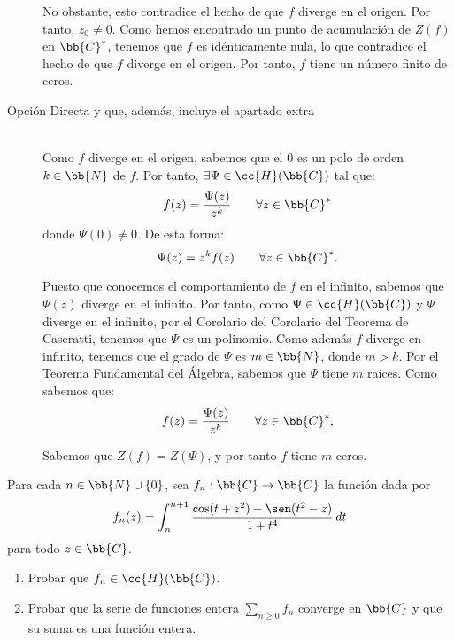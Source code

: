 \documentclass[12pt]{article}
\begin{document}
\begin{ejercicio}[2.5 + 1.5 puntos]
\begin{description}
                No obstante, esto contradice el hecho de que $f$ diverge en el origen. Por tanto, $z_0\neq 0$. Como hemos encontrado un punto de acumulación de $Z(f)$ en $\bb{C}^*$, tenemos que $f$ es idénticamente nula, lo que contradice el hecho de que $f$ diverge en el origen. Por tanto, $f$ tiene un número finito de ceros.\\
            \item[Opción Directa y que, además, incluye el apartado extra]~\\
            
            Como $f$ diverge en el origen, sabemos que el $0$ es un polo de orden $k\in \bb{N}$ de $f$. Por tanto, $\exists \Psi\in \cc{H}(\bb{C})$ tal que:
            \begin{equation*}
                f(z) = \dfrac{\Psi(z)}{z^k}\qquad \forall z\in \bb{C}^*
            \end{equation*}
            donde $\Psi(0)\neq 0$. De esta forma:
            \begin{equation*}
                \Psi(z) = z^k f(z)\qquad \forall z\in \bb{C}^*.
            \end{equation*}
    
            Puesto que conocemos el comportamiento de $f$ en el infinito, sabemos que $\Psi(z)$ diverge en el infinito. Por tanto, como $\Psi\in \cc{H}(\bb{C})$ y $\Psi$ diverge en el infinito, por el Corolario del Corolario del Teorema de Caseratti, tenemos que $\Psi$ es un polinomio. Como además $f$ diverge en infinito, tenemos que el grado de $\Psi$ es $m\in \bb{N}$, donde $m>k$. Por el Teorema Fundamental del Álgebra, sabemos que $\Psi$ tiene $m$ raíces. Como sabemos que:
            \begin{equation*}
                f(z) = \dfrac{\Psi(z)}{z^k}\qquad \forall z\in \bb{C}^*,
            \end{equation*}
    
            Sabemos que $Z(f) = Z(\Psi)$, y por tanto $f$ tiene $m$ ceros.
                
                
                
        \end{description}
    \end{ejercicio}

    \begin{ejercicio}[2.5 puntos]
        Para cada $n \in \bb{N} \cup \{0\}$, sea $f_n : \bb{C} \to \bb{C}$ la función dada por
        $$f_n(z) = \int_n^{n+1} \frac{\cos(t + z^2) + \sen(t^2 - z)}{1 + t^4} \, dt$$
        para todo $z \in \bb{C}$.
        \begin{enumerate}
            \item Probar que $f_n \in \cc{H}(\bb{C})$.
            \item Probar que la serie de funciones entera $\sum\limits_{n\geq 0} f_n$ converge en $\bb{C}$ y que su suma es una función entera.
        \end{enumerate}
    \end{ejercicio}
\end{document}
